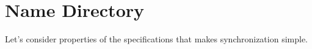 \section{Name Directory}
Let's consider properties of the specifications that makes synchronization simple.
